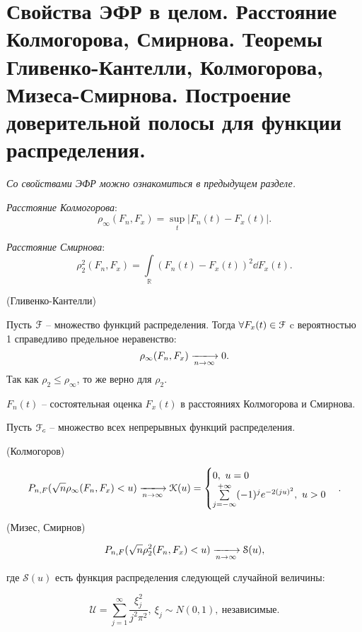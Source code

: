 \section{Свойства ЭФР в целом. Расстояние Колмогорова, Смирнова. Теоремы
Гливенко-Кантелли, Колмогорова, Мизеса-Смирнова. Построение доверительной
полосы для функции распределения.}

\textit{Со свойствами ЭФР можно ознакомиться в предыдущем разделе.}

\begin{definition}
  \textit{Расстояние Колмогорова}:
  \[
    \rho_{\infty} (F_n, F_x) = \sup_{t}|F_n(t) - F_x(t)|
  .\]
\end{definition}

\begin{definition}
  \textit{Расстояние Смирнова}:
  \[
    \rho^{2}_{2} (F_n, F_x) = \int\limits_{\mathbb{R}}(F_n(t) - F_x(t))^2
    \dd F_x(t)
  .\]
\end{definition}

\begin{theorem}(Гливенко-Кантелли)

  Пусть $\mathcal{F}$ -- множество функций распределения.
  Тогда $\forall F_x(t) \in \mathcal{F}$ c вероятностью 1 справедливо предельное
  неравенство:
  \[
    \rho_{\infty} (F_n, F_x) \xlongrightarrow[n \to \infty]{} 0
  .\]
  Так как $\rho_2 \leqslant \rho_{\infty}$, то же верно для $\rho_2$.

\end{theorem}

\begin{remark}
  $F_n(t)$ -- состоятельная оценка $F_x(t)$ в расстояниях Колмогорова и
  Смирнова.
\end{remark}

Пусть $\mathcal{F}_c$ -- множество всех непрерывных функций распределения.

\begin{theorem}(Колмогоров)

  \[
    P_{n, F}(\sqrt{n} \rho_{\infty} (F_n, F_x) < u)
    \xlongrightarrow[n \to \infty]{} \mathcal{K}(u) = \begin{cases}
      0,~ u = 0\\
      \sum\limits_{j = -\infty}^{+\infty} (-1)^j e^{-2 (ju)^2},~ u > 0
    \end{cases}
  .\]

\end{theorem}

\begin{theorem}(Мизес, Смирнов)

  \[
    P_{n, F}(\sqrt{n} \rho^{2}_{2} (F_n, F_x) < u)
    \xlongrightarrow[n \to \infty]{} \mathcal{S}(u)
  ,\]

  где $\mathcal{S}(u)$ есть функция распределения следующей случайной величины:

  \[
    \mathcal{U} = \sum\limits_{j = 1}^{\infty} \frac{\xi^2_j}{j^2 \pi^2},~
    \xi_j \sim N(0, 1),~ \text{независимые}
  .\]

\end{theorem}

